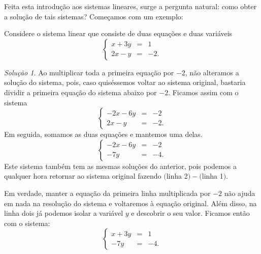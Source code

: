 Feita esta introdução aos  sistemas lineares, surge a pergunta natural: como obter a solução de tais sistemas?
Começamos com um exemplo:


\begin{ex}
Considere o sistema linear que consiste de duas equações e duas variáveis
\begin{equation}\label{exp1}
  \left\{
    \begin{array}{rcl}
      x+3y&=&1 \\
      2x-y&=&-2.
    \end{array}
  \right.
  \end{equation} %

\vspace{0.2cm}

\noindent\textit{Solução 1.} Ao multiplicar toda a primeira equação por $-2$, não alteramos a solução do sistema, pois, caso quiséssemos voltar ao sistema original, bastaria dividir a primeira equação do sistema abaixo por $-2$. Ficamos assim com o sistema
\begin{equation}
  \left\{
    \begin{array}{rcl}
      -2x-6y&=&-2 \\
      2x-y&=&-2.
    \end{array}
  \right.
\end{equation} Em seguida, somamos as duas equações e mantemos uma delas.
\begin{equation}
  \left\{
    \begin{array}{rcl}
      -2x-6y&=& -2 \\
      -7y & =& -4.
    \end{array}
  \right.
\end{equation} Este sistema também tem as mesmas soluções do anterior, pois podemos a qualquer hora retornar ao sistema original fazendo $($linha 2$)-($linha 1$)$.

Em verdade, manter a equação da primeira linha multiplicada por $-2$ não ajuda em nada na resolução do sistema e voltaremos à equação original. Além disso, na linha dois já podemos isolar a variável $y$ e descobrir o seu valor. Ficamos então com o sistema:
\begin{equation}\label{exp1-2}
  \left\{
    \begin{array}{rcl}
      x+3y&=& 1 \\
      -7y & =& -4.
    \end{array}
  \right.
\end{equation}


\end{ex}

